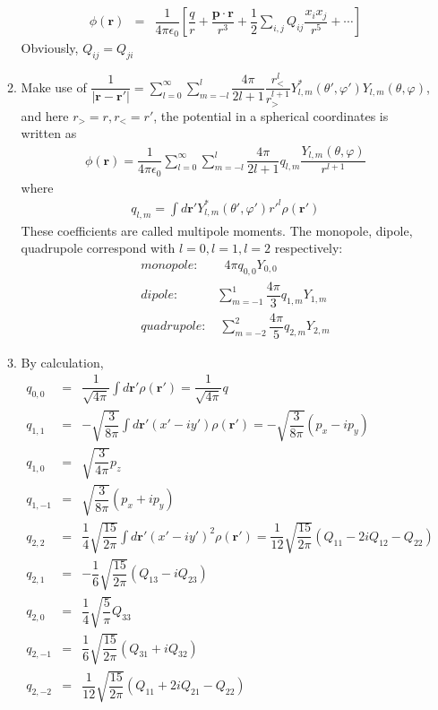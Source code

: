 \documentclass[a4paper,11pt]{article}
\begin{document}
\begin{enumerate}
\begin{enumerate}
\begin{eqnarray}
            \phi(\boldsymbol{r})&=&\dfrac{1}{4\pi\epsilon_0}\left[\dfrac{q}{r}+\dfrac{\boldsymbol{p}\cdot \boldsymbol{r}}{r^3}+\dfrac{1}{2}\sum\limits_{i,j}Q_{ij}\dfrac{x_ix_j}{r^5}+\dotsm\right]
        \end{eqnarray}
        Obviously, $Q_{ij}=Q_{ji}$
        \item Make use of $\dfrac{1}{|\boldsymbol{r}-\boldsymbol{r}'|}=\sum\limits_{l=0}^{\infty}\sum\limits_{m=-l}^{l}\dfrac{4\pi}{2l+1}\dfrac{r^{l}_{<}}{r^{l+1}_{>}}Y^{*}_{l,m}(\theta',\varphi')Y_{l,m}(\theta,\varphi)$, and here $r_>=r,r_<=r'$, the potential in a spherical coordinates is written as
        \begin{eqnarray}
            \phi(\boldsymbol{r})=\dfrac{1}{4\pi\epsilon_0}\sum\limits_{l=0}^{\infty}\sum\limits_{m=-l}^{l}\dfrac{4\pi}{2l+1}q_{l,m}\dfrac{Y_{l,m}(\theta,\varphi)}{r^{l+1}}
        \end{eqnarray}
        where 
        \begin{eqnarray}
            q_{l,m}=\int d\boldsymbol{r}' Y_{l,m}^{*}(\theta',\varphi')r'^l\rho(\boldsymbol{r}')
        \end{eqnarray}
        These coefficients are called multipole moments. The monopole, dipole, quadrupole correspond with $l=0, l=1, l=2$ respectively:
        \begin{eqnarray}
            &&monopole:\quad\quad 4\pi q_{0,0}Y_{0,0}\\
            &&dipole:\quad\quad\quad \sum\limits_{m=-1}^{1}\dfrac{4\pi}{3}q_{1,m}Y_{1,m}\\
            &&quadrupole:\quad \sum\limits_{m=-2}^{2}\dfrac{4\pi}{5}q_{2,m}Y_{2,m}
        \end{eqnarray}
        \item By calculation, 
        \begin{eqnarray}
            q_{0,0}&=&\dfrac{1}{\sqrt{4\pi}}\int d\boldsymbol{r}'\rho(\boldsymbol{r}')=\dfrac{1}{\sqrt{4\pi}}q \\
            q_{1,1}&=&-\sqrt{\dfrac{3}{8\pi}}\int d\boldsymbol{r}'(x'-iy')\rho(\boldsymbol{r}')=-\sqrt{\dfrac{3}{8\pi}}(p_x-ip_y) \nonumber\\
            q_{1,0}&=&\sqrt{\dfrac{3}{4\pi}}p_z \\
            q_{1,-1}&=&\sqrt{\dfrac{3}{8\pi}}(p_x+ip_y) \nonumber\\
            q_{2,2}&=&\dfrac{1}{4}\sqrt{\dfrac{15}{2\pi}}\int d\boldsymbol{r}'(x'-iy')^2\rho(\boldsymbol{r}')=\dfrac{1}{12}\sqrt{\dfrac{15}{2\pi}}(Q_{11}-2iQ_{12}-Q_{22}) \nonumber \\
            q_{2,1}&=&-\dfrac{1}{6}\sqrt{\dfrac{15}{2\pi}}(Q_{13}-iQ_{23}) \nonumber \\
            q_{2,0}&=&\dfrac{1}{4}\sqrt{\dfrac{5}{\pi}}Q_{33}\\
            q_{2,-1}&=&\dfrac{1}{6}\sqrt{\dfrac{15}{2\pi}}(Q_{31}+iQ_{32}) \nonumber \\
            q_{2,-2}&=&\dfrac{1}{12}\sqrt{\dfrac{15}{2\pi}}(Q_{11}+2iQ_{21}-Q_{22}) \nonumber \\
        \end{eqnarray}
    \end{enumerate}
\end{enumerate}
\end{document}
